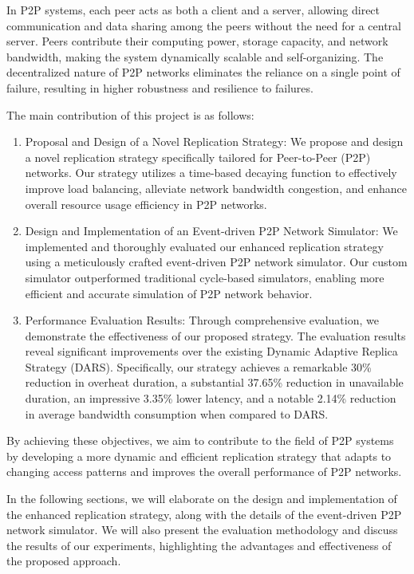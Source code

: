 \documentclass[10pt, conference]{IEEEtran}
\begin{document}
In P2P systems, each peer acts as both a client and a server, allowing direct communication and data sharing among the peers without the need for a central server. Peers contribute their computing power, storage capacity, and network bandwidth, making the system dynamically scalable and self-organizing. The decentralized nature of P2P networks eliminates the reliance on a single point of failure, resulting in higher robustness and resilience to failures.

The main contribution of this project is as follows:

\begin{enumerate}
\item Proposal and Design of a Novel Replication Strategy: We propose and design a novel replication strategy specifically tailored for Peer-to-Peer (P2P) networks. Our strategy utilizes a time-based decaying function to effectively improve load balancing, alleviate network bandwidth congestion, and enhance overall resource usage efficiency in P2P networks.

\item Design and Implementation of an Event-driven P2P Network Simulator: We implemented and thoroughly evaluated our enhanced replication strategy using a meticulously crafted event-driven P2P network simulator. Our custom simulator outperformed traditional cycle-based simulators, enabling more efficient and accurate simulation of P2P network behavior.

\item Performance Evaluation Results: Through comprehensive evaluation, we demonstrate the effectiveness of our proposed strategy. The evaluation results reveal significant improvements over the existing Dynamic Adaptive Replica Strategy (DARS). Specifically, our strategy achieves a remarkable 30\% reduction in overheat duration, a substantial 37.65\% reduction in unavailable duration, an impressive 3.35\% lower latency, and a notable 2.14\% reduction in average bandwidth consumption when compared to DARS.
\end{enumerate}

By achieving these objectives, we aim to contribute to the field of P2P systems by developing a more dynamic and efficient replication strategy that adapts to changing access patterns and improves the overall performance of P2P networks.


In the following sections, we will elaborate on the design and implementation of the enhanced replication strategy, along with the details of the event-driven P2P network simulator. We will also present the evaluation methodology and discuss the results of our experiments, highlighting the advantages and effectiveness of the proposed approach.
\end{document}
